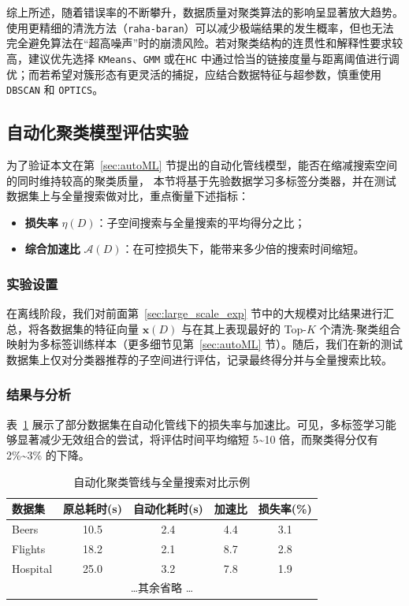 \documentclass[10pt]{article} %
\numberwithin{equation}{section}
\begin{document}
\noindent
综上所述，随着错误率的不断攀升，数据质量对聚类算法的影响呈显著放大趋势。使用更精细的清洗方法（\texttt{raha-baran}）可以减少极端结果的发生概率，但也无法完全避免算法在“超高噪声”时的崩溃风险。若对聚类结构的连贯性和解释性要求较高，建议优先选择 \texttt{KMeans}、\texttt{GMM} 或在\texttt{HC} 中通过恰当的链接度量与距离阈值进行调优；而若希望对簇形态有更灵活的捕捉，应结合数据特征与超参数，慎重使用 \texttt{DBSCAN} 和 \texttt{OPTICS}。



\subsection{自动化聚类模型评估实验}
\label{sec:automl_exp}

为了验证本文在第~\ref{sec:autoML} 节提出的自动化管线模型，能否在缩减搜索空间的同时维持较高的聚类质量，
本节将基于先验数据学习多标签分类器，并在测试数据集上与全量搜索做对比，重点衡量下述指标：
\begin{itemize}
    \item \textbf{损失率} \(\eta(D)\)：子空间搜索与全量搜索的平均得分之比；
    \item \textbf{综合加速比} \(\mathcal{A}(D)\)：在可控损失下，能带来多少倍的搜索时间缩短。
\end{itemize}

\subsubsection{实验设置}
\label{sec:exp_setting_automl}
在离线阶段，我们对前面第~\ref{sec:large_scale_exp} 节中的大规模对比结果进行汇总，将各数据集的特征向量 \(\mathbf{x}(D)\) 与在其上表现最好的 Top-$K$ 个清洗-聚类组合映射为多标签训练样本（更多细节见第~\ref{sec:autoML} 节）。随后，我们在新的测试数据集上仅对分类器推荐的子空间进行评估，记录最终得分并与全量搜索比较。

\subsubsection{结果与分析}
\label{sec:res_analysis_automl}
表~\ref{tab:autoML_res} 展示了部分数据集在自动化管线下的损失率与加速比。可见，多标签学习能够显著减少无效组合的尝试，将评估时间平均缩短 5\textasciitilde10 倍，而聚类得分仅有 2\%\textasciitilde3\% 的下降。

\begin{table}[htbp]
\centering
\caption{自动化聚类管线与全量搜索对比示例}
\label{tab:autoML_res}
\begin{tabular}{lcccc}
\toprule
\textbf{数据集} & \textbf{原总耗时(s)} & \textbf{自动化耗时(s)} & \textbf{加速比} & \textbf{损失率(\%)} \\
\midrule
Beers & 10.5 & 2.4 & 4.4 & 3.1 \\
Flights & 18.2 & 2.1 & 8.7 & 2.8 \\
Hospital & 25.0 & 3.2 & 7.8 & 1.9 \\
\multicolumn{5}{c}{\dots 其余省略 \dots} \\
\bottomrule
\end{tabular}
\end{table}
\end{document}
